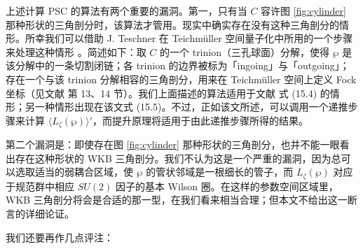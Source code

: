 上述计算 PSC 的算法有两个重要的漏洞。第一，只有当 $C$ 容许图 \ref{fig:cylinder} 那种形状的三角剖分时，该算法才管用。现实中确实存在没有这种三角剖分的情形。所幸我们可以借助 J. Teschner 在 Teichm\"uller 空间量子化中所用的一个步骤来处理这种情形 \cite{Teschner:2005bz}。简述如下：取 $C$ 的一个 trinion（三孔球面）分解，使得 $\wp$ 是该分解中的一条切割闭链；各 trinion 的边界被标为「ingoing」与「outgoing」；存在一个与该 trinion 分解相容的三角剖分，用来在 Teichm\"uller 空间上定义 Fock 坐标（见文献 \cite{Teschner:2005bz} 第 13、14 节）。我们上面描述的算法适用于文献 \cite{Teschner:2005bz} 式 (15.4) 的情形；另一种情形出现在该文式 (15.5)。不过，正如该文所述，可以调用一个递推步骤来计算 $\langle L_\zeta(\wp)\rangle'$，而提升原理将适用于由此递推步骤所得的结果。

第二个漏洞是：即使存在图 \ref{fig:cylinder} 那种形状的三角剖分，也并不能一眼看出存在这种形状的 WKB 三角剖分。我们不认为这是一个严重的漏洞，因为总可以选取适当的弱耦合区域，使 $\wp$ 的管状邻域是一根细长的管子，而 $L_\zeta(\wp)$ 对应于规范群中相应 $SU(2)$ 因子的基本 Wilson 圈。在这样的参数空间区域里，WKB 三角剖分将会是合适的那一型，在我们看来相当合理；但本文不给出这一断言的详细论证。

我们还要再作几点评注：

